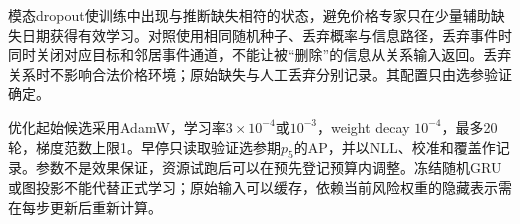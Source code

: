 模态dropout使训练中出现与推断缺失相符的状态，避免价格专家只在少量辅助缺失日期获得有效学习。对照使用相同随机种子、丢弃概率与信息路径，丢弃事件时同时关闭对应目标和邻居事件通道，不能让被“删除”的信息从关系输入返回。丢弃关系时不影响合法价格环境；原始缺失与人工丢弃分别记录。其配置只由选参验证确定。


优化起始候选采用AdamW，学习率$3\times10^{-4}$或$10^{-3}$，weight decay $10^{-4}$，最多20轮，梯度范数上限1。早停只读取验证选参期$p_5$的AP，并以NLL、校准和覆盖作记录。参数不是效果保证，资源试跑后可以在预先登记预算内调整。冻结随机GRU或图投影不能代替正式学习；原始输入可以缓存，依赖当前风险权重的隐藏表示需在每步更新后重新计算。
